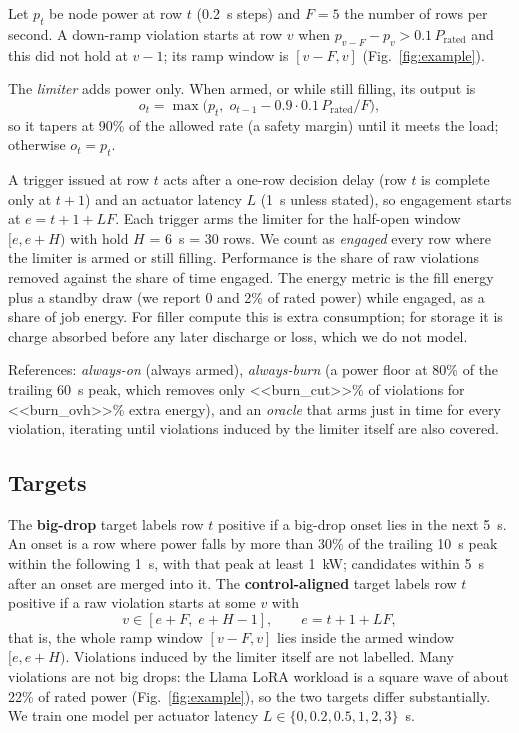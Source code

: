 \documentclass[11pt]{article}
\begin{document}
Let $p_t$ be node power at row $t$ (0.2~s steps) and $F=5$ the number of rows per second. A down-ramp
violation starts at row $v$ when $p_{v-F} - p_v > 0.1\,P_{\mathrm{rated}}$ and this did not hold at $v-1$;
its ramp window is $[v-F, v]$ (Fig.~\ref{fig:example}).

The \emph{limiter} adds power only. When armed, or while still filling, its output is
\begin{equation}
o_t = \max\bigl(p_t,\; o_{t-1} - 0.9\cdot 0.1\,P_{\mathrm{rated}}/F\bigr),
\end{equation}
so it tapers at 90\% of the allowed rate (a safety margin) until it meets the load; otherwise $o_t = p_t$.

A trigger issued at row $t$ acts after a one-row decision delay (row $t$ is complete only at $t+1$) and
an actuator latency $L$ (1~s unless stated), so engagement starts at $e = t + 1 + L F$. Each trigger arms
the limiter for the half-open window $[e, e+H)$ with hold $H$ = 6~s = 30 rows. We count as
\emph{engaged} every row where the limiter is armed or still filling. Performance is the share of raw
violations removed against the share of time engaged. The energy metric is the fill energy plus a standby
draw (we report 0 and 2\% of rated power) while engaged, as a share of job energy. For filler compute this is
extra consumption; for storage it is charge absorbed before any later discharge or loss, which we do not
model.

References: \emph{always-on} (always armed), \emph{always-burn} (a power floor at 80\% of the trailing 60~s peak, which removes only
<<burn_cut>>\% of violations for <<burn_ovh>>\% extra energy), and an \emph{oracle} that arms just in
time for every violation, iterating until violations induced by the limiter itself are also covered.

\subsection{Targets}

The \textbf{big-drop} target labels row $t$ positive if a big-drop onset lies in the next 5~s. An onset
is a row where power falls by more than 30\% of the trailing 10~s peak within the following 1~s, with that
peak at least 1~kW; candidates within 5~s after an onset are merged into it. The \textbf{control-aligned} target labels row $t$ positive if a raw
violation starts at some $v$ with
\begin{equation}
v \in [e + F,\; e + H - 1], \qquad e = t + 1 + LF,
\end{equation}
that is, the whole ramp window $[v-F, v]$ lies inside the armed window $[e, e+H)$. Violations induced by
the limiter itself are not labelled. Many violations are not big drops: the Llama LoRA workload is a
square wave of about 22\% of rated power (Fig.~\ref{fig:example}), so the two targets differ
substantially. We train one model per actuator latency $L \in \{0, 0.2, 0.5, 1, 2, 3\}$~s.
\end{document}
